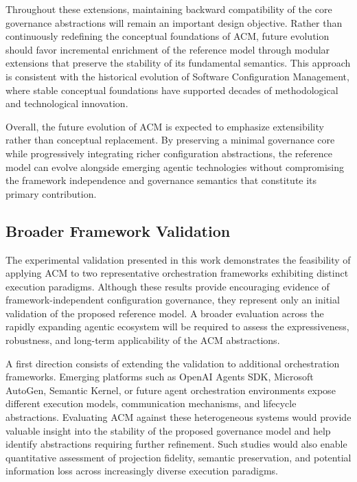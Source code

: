 \documentclass[10pt]{article}
\begin{document}
Throughout these extensions, maintaining backward compatibility of the core governance abstractions will remain an important design objective. Rather than continuously redefining the conceptual foundations of ACM, future evolution should favor incremental enrichment of the reference model through modular extensions that preserve the stability of its fundamental semantics. This approach is consistent with the historical evolution of Software Configuration Management, where stable conceptual foundations have supported decades of methodological and technological innovation.

Overall, the future evolution of ACM is expected to emphasize extensibility rather than conceptual replacement. By preserving a minimal governance core while progressively integrating richer configuration abstractions, the reference model can evolve alongside emerging agentic technologies without compromising the framework independence and governance semantics that constitute its primary contribution.

\subsection{Broader Framework Validation}

The experimental validation presented in this work demonstrates the feasibility of applying ACM to two representative orchestration frameworks exhibiting distinct execution paradigms. Although these results provide encouraging evidence of framework-independent configuration governance, they represent only an initial validation of the proposed reference model. A broader evaluation across the rapidly expanding agentic ecosystem will be required to assess the expressiveness, robustness, and long-term applicability of the ACM abstractions.

A first direction consists of extending the validation to additional orchestration frameworks. Emerging platforms such as OpenAI Agents SDK, Microsoft AutoGen, Semantic Kernel, or future agent orchestration environments expose different execution models, communication mechanisms, and lifecycle abstractions. Evaluating ACM against these heterogeneous systems would provide valuable insight into the stability of the proposed governance model and help identify abstractions requiring further refinement. Such studies would also enable quantitative assessment of projection fidelity, semantic preservation, and potential information loss across increasingly diverse execution paradigms.
\end{document}
